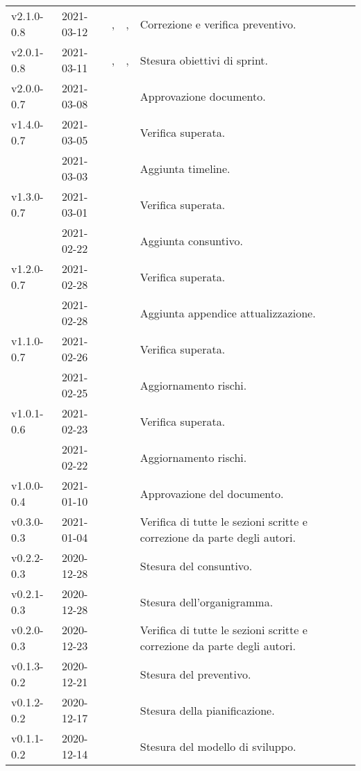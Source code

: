 {\begin{longtable}{C{.131777\freewidth} C{.134036\freewidth} C{.263554\freewidth} C{.188254\freewidth} C{.282379\freewidth}}
		v2.1.0-0.8 & 2021-03-12 & \Lucrezia{},\newline{} \Matteo{} & \ver{},\newline{} \prog{} & Correzione e verifica preventivo. \\
		v2.0.1-0.8 & 2021-03-11 & \Daniele{},\newline{} \Davide{} & \ver{},\newline{} \progr{} & Stesura obiettivi di sprint. \\
		v2.0.0-0.7 & 2021-03-08 & \Matteo{} & \RdP{} & Approvazione documento. \\
		v1.4.0-0.7 & 2021-03-05 & \Davide{} & \ver{} & Verifica superata. \\
		& 2021-03-03 & \Daniele{} & \ana{} & Aggiunta timeline. \\
		v1.3.0-0.7 & 2021-03-01 & \Giosue{} & \ver{} & Verifica superata. \\
		& 2021-02-22 & \Daniele{} & \ana{} & Aggiunta consuntivo. \\
		v1.2.0-0.7 & 2021-02-28 & \Davide{} & \ana{} & Verifica superata. \\
		& 2021-02-28 & \Lucrezia{} & \ana{} & Aggiunta appendice attualizzazione. \\
		v1.1.0-0.7 & 2021-02-26 & \Giosue{} & \ver{} & Verifica superata. \\
		 & 2021-02-25 & \Lucrezia{} & \ana{} & Aggiornamento rischi. \\
		v1.0.1-0.6 & 2021-02-23 & \Davide{} & \ver{} & Verifica superata. \\
		& 2021-02-22 & \Daniele{} & \ana{} & Aggiornamento rischi. \\
		v1.0.0-0.4 & 2021-01-10 & \Daniele{} & \RdP{} & Approvazione del documento. \\
		v0.3.0-0.3 & 2021-01-04 & \Lucrezia{} & \ver{} & Verifica di tutte le sezioni scritte e correzione da parte degli autori. \\

		v0.2.2-0.3 & 2020-12-28 & \Tommaso{} & \ana{} & Stesura del consuntivo. \\
		v0.2.1-0.3 & 2020-12-28 & \Matteo{} & \ana{} & Stesura dell'organigramma. \\

		v0.2.0-0.3 & 2020-12-23 & \Giosue{} & \ver{} & Verifica di tutte le sezioni scritte e correzione da parte degli autori. \\
		v0.1.3-0.2 & 2020-12-21 & \Tommaso{} & \ana{} & Stesura del preventivo. \\
		v0.1.2-0.2 & 2020-12-17 & \Tommaso{} & \ana{} & Stesura della pianificazione. \\
		v0.1.1-0.2 & 2020-12-14 & \Matteo{} & \ana{} & Stesura del modello di sviluppo. \\


\end{longtable}}
